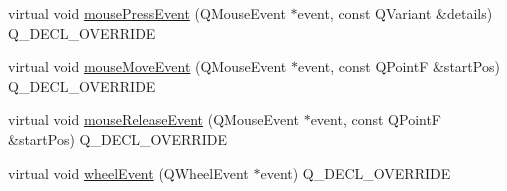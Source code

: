 \begin{DoxyCompactItemize}
\item 
virtual void \hyperlink{class_q_c_p_color_scale_ab73a9f3a28aec68494e26bbdd1bb987a}{mouse\+Press\+Event} (Q\+Mouse\+Event $\ast$event, const Q\+Variant \&details) Q\+\_\+\+D\+E\+C\+L\+\_\+\+O\+V\+E\+R\+R\+I\+DE
\item 
virtual void \hyperlink{class_q_c_p_color_scale_a57afb0708a8ecec9ae0feb4536f7e933}{mouse\+Move\+Event} (Q\+Mouse\+Event $\ast$event, const Q\+PointF \&start\+Pos) Q\+\_\+\+D\+E\+C\+L\+\_\+\+O\+V\+E\+R\+R\+I\+DE
\item 
virtual void \hyperlink{class_q_c_p_color_scale_ae19d4f32e96db2bd26be8956d6444e26}{mouse\+Release\+Event} (Q\+Mouse\+Event $\ast$event, const Q\+PointF \&start\+Pos) Q\+\_\+\+D\+E\+C\+L\+\_\+\+O\+V\+E\+R\+R\+I\+DE
\item 
virtual void \hyperlink{class_q_c_p_color_scale_a5cda10e845bfe04ed63efd55acc212ae}{wheel\+Event} (Q\+Wheel\+Event $\ast$event) Q\+\_\+\+D\+E\+C\+L\+\_\+\+O\+V\+E\+R\+R\+I\+DE
\end{DoxyCompactItemize}
